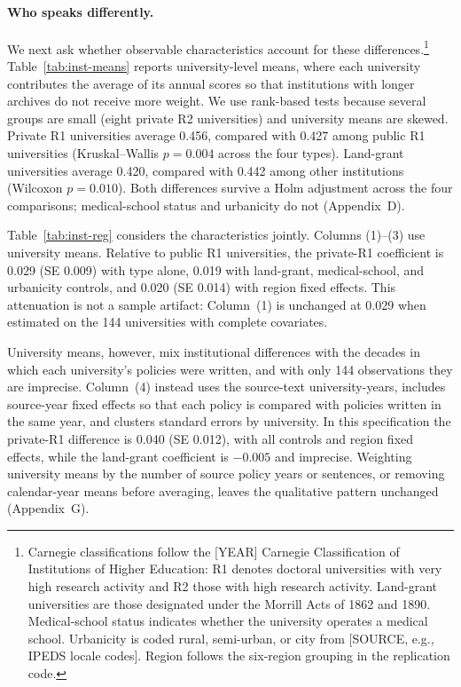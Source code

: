 \paragraph{Who speaks differently.} We next ask whether observable characteristics account for these differences.\footnote{Carnegie classifications follow the [YEAR] Carnegie Classification of Institutions of Higher Education: R1 denotes doctoral universities with very high research activity and R2 those with high research activity. Land-grant universities are those designated under the Morrill Acts of 1862 and 1890. Medical-school status indicates whether the university operates a medical school. Urbanicity is coded rural, semi-urban, or city from [SOURCE, e.g., IPEDS locale codes]. Region follows the six-region grouping in the replication code.} Table~\ref{tab:inst-means} reports university-level means, where each university contributes the average of its annual scores so that institutions with longer archives do not receive more weight. We use rank-based tests because several groups are small (eight private R2 universities) and university means are skewed. Private R1 universities average 0.456, compared with 0.427 among public R1 universities (Kruskal--Wallis $p = 0.004$ across the four types). Land-grant universities average 0.420, compared with 0.442 among other institutions (Wilcoxon $p = 0.010$). Both differences survive a Holm adjustment across the four comparisons; medical-school status and urbanicity do not (Appendix~D).

Table~\ref{tab:inst-reg} considers the characteristics jointly. Columns (1)--(3) use university means. Relative to public R1 universities, the private-R1 coefficient is 0.029 (SE 0.009) with type alone, 0.019 with land-grant, medical-school, and urbanicity controls, and 0.020 (SE 0.014) with region fixed effects. This attenuation is not a sample artifact: Column~(1) is unchanged at 0.029 when estimated on the 144 universities with complete covariates.

University means, however, mix institutional differences with the decades in which each university's policies were written, and with only 144 observations they are imprecise. Column~(4) instead uses the source-text university-years, includes source-year fixed effects so that each policy is compared with policies written in the same year, and clusters standard errors by university. In this specification the private-R1 difference is 0.040 (SE 0.012), with all controls and region fixed effects, while the land-grant coefficient is $-0.005$ and imprecise. Weighting university means by the number of source policy years or sentences, or removing calendar-year means before averaging, leaves the qualitative pattern unchanged (Appendix~G).

